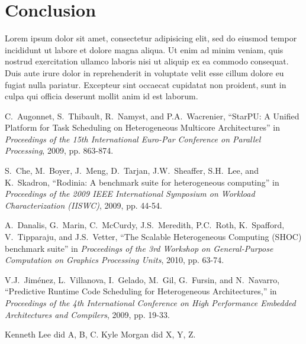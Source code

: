 \documentclass[journal]{IEEEtran}
\begin{document}



\section{Conclusion}
Lorem ipsum dolor sit amet, consectetur adipisicing elit, sed do
eiusmod tempor incididunt ut labore et dolore magna aliqua. Ut
enim ad minim veniam, quis nostrud exercitation ullamco laboris
nisi ut aliquip ex ea commodo consequat. Duis aute irure dolor
in reprehenderit in voluptate velit esse cillum dolore eu fugiat
nulla pariatur. Excepteur sint occaecat cupidatat non proident,
sunt in culpa qui officia deserunt mollit anim id est laborum.

\begin{thebibliography}{1}

C.~Augonnet, S.~Thibault, R.~Namyst, and P.A.~Wacrenier,
``StarPU: A Unified Platform for Task Scheduling on Heterogeneous Multicore Architectures'' in
\emph{Proceedings of the 15th International Euro-Par Conference on Parallel Processing}, 2009, pp. 863-874.

S.~Che, M.~Boyer, J.~Meng, D.~Tarjan, J.W.~Sheaffer, S.H.~Lee, and K.~Skadron,
``Rodinia: A benchmark suite for heterogeneous computing'' in
\emph{Proceedings of the 2009 IEEE International Symposium on Workload Characterization (IISWC)}, 2009, pp. 44-54.

A.~Danalis, G.~Marin, C.~McCurdy, J.S.~Meredith, P.C.~Roth, K.~Spafford, V.~Tipparaju, and J.S.~Vetter,
``The Scalable Heterogeneous Computing (SHOC) benchmark suite'' in
\emph{Proceedings of the 3rd Workshop on General-Purpose Computation on Graphics Processing Units}, 2010, pp. 63-74.

V.J.~Jiménez, L.~Villanova, I.~Gelado, M.~Gil, G.~Fursin, and N.~Navarro,
``Predictive Runtime Code Scheduling for Heterogeneous Architectures,'' in
\emph{Proceedings of the 4th International Conference on High Performance Embedded
Architectures and Compilers}, 2009, pp. 19-33.

\end{thebibliography}

\newpage
{}
Kenneth Lee did A, B, C.  Kyle Morgan did X, Y, Z.
\end{document}
